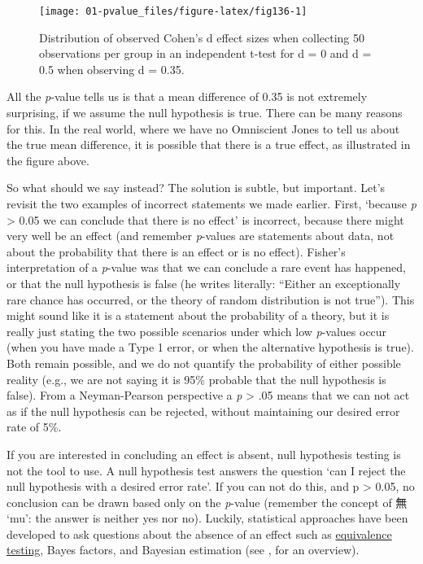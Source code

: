 \documentclass[
  oneside]{book}
\begin{document}
\begin{figure}

{\centering \texttt{[image: 01-pvalue\_files/figure-latex/fig136-1]} 

}

\caption{Distribution of observed Cohen's d effect sizes when collecting 50 observations per group in an independent t-test for d = 0 and d = 0.5 when observing d = 0.35.}\label{fig:fig136}
\end{figure}

All the \emph{p}-value tells us is that a mean difference of 0.35 is not extremely surprising, if we assume the null hypothesis is true. There can be many reasons for this. In the real world, where we have no Omniscient Jones to tell us about the true mean difference, it is possible that there is a true effect, as illustrated in the figure above.

So what should we say instead? The solution is subtle, but important. Let's revisit the two examples of incorrect statements we made earlier. First, `because \emph{p} \textgreater{} 0.05 we can conclude that there is no effect' is incorrect, because there might very well be an effect (and remember \emph{p}-values are statements about data, not about the probability that there is an effect or is no effect). Fisher's interpretation of a \emph{p}-value was that we can conclude a rare event has happened, or that the null hypothesis is false (he writes literally: ``Either an exceptionally rare chance has occurred, or the theory of random distribution is not true''). This might sound like it is a statement about the probability of a theory, but it is really just stating the two possible scenarios under which low \emph{p}-values occur (when you have made a Type 1 error, or when the alternative hypothesis is true). Both remain possible, and we do not quantify the probability of either possible reality (e.g., we are not saying it is 95\% probable that the null hypothesis is false). From a Neyman-Pearson perspective a \emph{p} \textgreater{} .05 means that we can not act as if the null hypothesis can be rejected, without maintaining our desired error rate of 5\%.

If you are interested in concluding an effect is absent, null hypothesis testing is not the tool to use. A null hypothesis test answers the question `can I reject the null hypothesis with a desired error rate'. If you can not do this, and p \textgreater{} 0.05, no conclusion can be drawn based only on the \emph{p}-value (remember the concept of 無 `mu': the answer is neither yes nor no). Luckily, statistical approaches have been developed to ask questions about the absence of an effect such as \protect\hyperlink{equivalencetest}{equivalence testing}, Bayes factors, and Bayesian estimation (see \citet{harms_making_2018}, for an overview).
\end{document}
